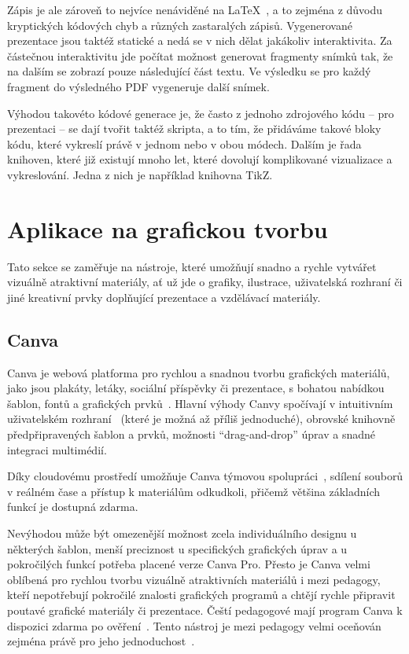 Zápis je ale zároveň to nejvíce nenáviděné na \LaTeX~\cite{latex_reddit}, a to zejména z důvodu kryptických kódových chyb a různých zastaralých zápisů.
Vygenerované prezentace jsou taktéž statické a nedá se v nich dělat jakákoliv interaktivita. 
Za částečnou interaktivitu jde počítat možnost generovat fragmenty snímků tak, že na dalším se zobrazí pouze následující část textu.
Ve výsledku se pro každý fragment do výsledného PDF vygeneruje další snímek.

Výhodou takovéto kódové generace je, že často z jednoho zdrojového kódu -- pro prezentaci -- se dají tvořit taktéž skripta, a to tím, že přidáváme takové bloky kódu, které vykreslí právě v jednom nebo v obou módech.
Dalším je řada knihoven, které již existují mnoho let, které dovolují komplikované vizualizace a vykreslování.
Jedna z nich je například knihovna TikZ. 

\section{Aplikace na grafickou tvorbu}

Tato sekce se zaměřuje na nástroje, které umožňují snadno a rychle vytvářet vizuálně atraktivní materiály, ať už jde o grafiky, ilustrace, uživatelská rozhraní či jiné kreativní prvky doplňující prezentace a vzdělávací materiály.

\subsection{Canva}\label{text:canva}

Canva je webová platforma pro rychlou a snadnou tvorbu grafických materiálů, jako jsou plakáty, letáky, sociální příspěvky či prezentace, s bohatou nabídkou šablon, fontů a grafických prvků~\cite{canva_website}. 
Hlavní výhody Canvy spočívají v intuitivním uživatelském rozhraní~\cite{canva_recenze} (které je možná až příliš jednoduché), obrovské knihovně předpřipravených šablon a prvků, možnosti \enquote{drag-and-drop} úprav a snadné integraci multimédií.

Díky cloudovému prostředí umožňuje Canva týmovou spolupráci~\cite{canva_live_help, canva_live_features}, sdílení souborů v reálném čase a přístup k materiálům odkudkoli, přičemž většina základních funkcí je dostupná zdarma. 

Nevýhodou může být omezenější možnost zcela individuálního designu u některých šablon, menší preciznost u specifických grafických úprav a u pokročilých funkcí potřeba placené verze Canva Pro. 
Přesto je Canva velmi oblíbená pro rychlou tvorbu vizuálně atraktivních materiálů i mezi pedagogy, kteří nepotřebují pokročilé znalosti grafických programů a chtějí rychle připravit poutavé grafické materiály či prezentace.
Čeští pedagogové mají program Canva k dispozici zdarma po ověření~\cite{canva_education}. Tento nástroj je mezi pedagogy velmi oceňován zejména právě pro jeho jednoduchost~\cite{canva_facebook}.

